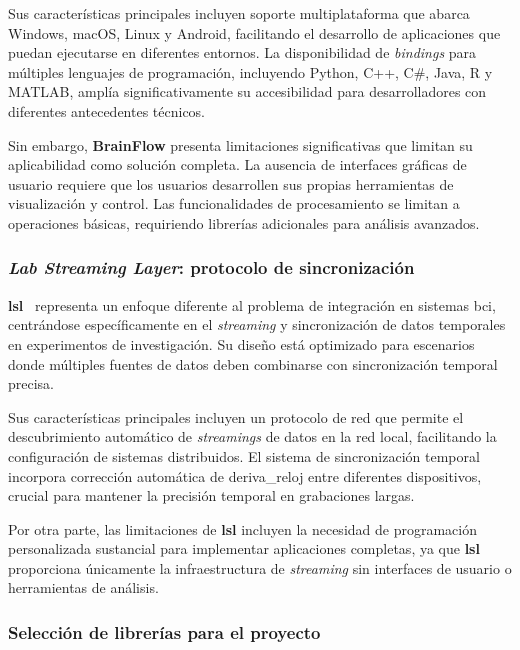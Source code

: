 Sus características principales incluyen soporte multiplataforma que abarca Windows, macOS, Linux y Android, facilitando el desarrollo de aplicaciones que puedan ejecutarse en diferentes entornos. La disponibilidad de \textit{\gls{bindings}} para múltiples lenguajes de programación, incluyendo Python, C++, C\#, Java, R y MATLAB, amplía significativamente su accesibilidad para desarrolladores con diferentes antecedentes técnicos.

Sin embargo, \textbf{BrainFlow} presenta limitaciones significativas que limitan su aplicabilidad como solución completa. La ausencia de interfaces gráficas de usuario requiere que los usuarios desarrollen sus propias herramientas de visualización y control. Las funcionalidades de procesamiento se limitan a operaciones básicas, requiriendo librerías adicionales para análisis avanzados.

\subsubsection{\textit{Lab Streaming Layer}: protocolo de sincronización}
\label{subsubsec:lsl}

\textbf{\acrfull{lsl}}~\cite{kothe2013lab,Blum2021} representa un enfoque diferente al problema de integración en sistemas \acrshort{bci}, centrándose específicamente en el \textit{\gls{streaming}} y sincronización de datos temporales en experimentos de investigación. Su diseño está optimizado para escenarios donde múltiples fuentes de datos deben combinarse con sincronización temporal precisa.

Sus características principales incluyen un protocolo de red que permite el descubrimiento automático de \textit{\glspl{streaming}} de datos en la red local, facilitando la configuración de sistemas distribuidos. El sistema de sincronización temporal incorpora corrección automática de \gls{deriva_reloj} entre diferentes dispositivos, crucial para mantener la precisión temporal en grabaciones largas.

Por otra parte, las limitaciones de \textbf{\acrshort{lsl}} incluyen la necesidad de programación personalizada sustancial para implementar aplicaciones completas, ya que \textbf{\acrshort{lsl}} proporciona únicamente la infraestructura de \textit{\gls{streaming}} sin interfaces de usuario o herramientas de análisis.

\subsubsection{Selección de librerías para el proyecto}
\label{subsubsec:seleccion_librerias}

